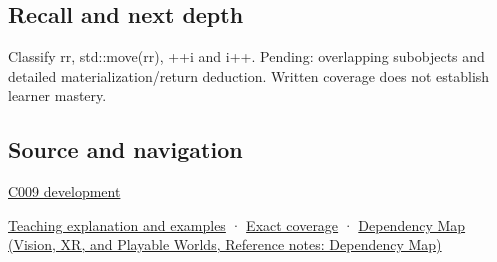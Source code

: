 \subsection{Recall and next depth}\label{appendix-1121b30eaeb0-recall-and-next-depth}

Classify rr, std::move(rr), ++i and i++. Pending: overlapping subobjects and detailed materialization/return deduction. Written coverage does not establish learner mastery.

\subsection{Source and navigation}\label{appendix-1121b30eaeb0-source-and-navigation}

\hyperref[appendix-fd090d982a15-m009---parts-127-147]{C009 development}

\hyperref[01-foundations-i-ch003-an-expression-has-a-type-and-a-category]{Teaching explanation and examples} · \hyperref[appendix-fd090d982a15-m008---parts-113-126]{Exact coverage} · \href{../07-Vision-XR-and-Playable-Worlds/main.pdf\#nameddest=appendix-4ad47bdd269a}{Dependency Map (Vision, XR, and Playable Worlds, Reference notes: Dependency Map)}
